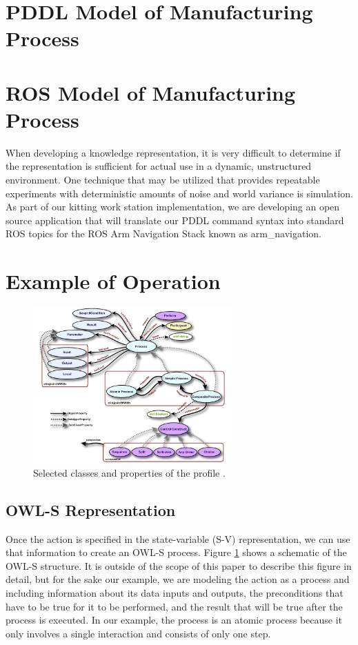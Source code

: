 \documentclass[a4paper, 10pt, conference]{ieeeconf}      %
\begin{document}
\section{PDDL Model of Manufacturing Process}
\label{sect:PDDL_Layer}
%

\section{ROS Model of Manufacturing Process}
\label{sect:ROS}
When developing a knowledge representation, it is very difficult to determine if the representation is sufficient for actual use in a dynamic, unstructured environment.
One technique that may be utilized that provides repeatable experiments with deterministic amounts of noise and world variance is simulation. As part of our kitting work
station implementation, we are developing an open source application that will translate our PDDL command syntax into standard ROS topics for the ROS Arm Navigation 
Stack known as arm\_navigation.

\section{Example of Operation}
\label{sect:Example}
\begin{figure}[htb]
\includegraphics[width=7.6cm]{images/OWL-S.jpg}
\caption{Selected classes and properties of the profile \cite{OWL-S}.}
\label{fig:OWL-S}
\end{figure}
\subsection{OWL-S Representation}
Once the action is specified in the state-variable (S-V) representation, we can use that information to create an OWL-S process. Figure \ref{fig:OWL-S} shows a schematic of the OWL-S structure. It is outside of the scope of this paper to describe this figure in detail, but for the sake our example, we are modeling the action as a process and including information about its data inputs and outputs, the preconditions that have to be true for it to be performed, and the result that will be true after the process is executed. In our example, the process is an atomic process because it only involves a single interaction and consists of only one step.
\end{document}
